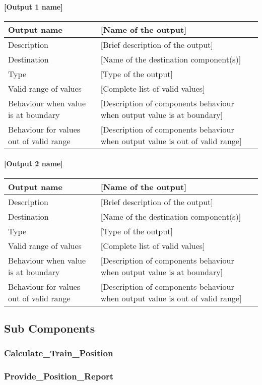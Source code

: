\paragraph{[Output 1 name]}

\begin{longtable}{p{}p{}}
\toprule
Output name				& [Name of the output] \\
\midrule
Description				& [Brief description of the output] \\
\midrule
Destination				& [Name of the destination component(s)] \\ 
\midrule
Type					& [Type of the output] \\
\midrule
Valid range of values	& [Complete list of valid values] \\
\midrule
Behaviour when value is at boundary	& [Description of components behaviour when output value is at boundary] \\
\midrule
Behaviour for values out of valid range	& [Description of components behaviour when output value is out of valid range] \\
\bottomrule
\end{longtable}


\paragraph{[Output 2 name]}

\begin{longtable}{p{}p{}}
\toprule
Output name				& [Name of the output] \\
\midrule
Description				& [Brief description of the output] \\
\midrule
Destination				& [Name of the destination component(s)] \\ 
\midrule
Type					& [Type of the output] \\
\midrule
Valid range of values	& [Complete list of valid values] \\
\midrule
Behaviour when value is at boundary	& [Description of components behaviour when output value is at boundary] \\
\midrule
Behaviour for values out of valid range	& [Description of components behaviour when output value is out of valid range] \\
\bottomrule
\end{longtable}


\subsection{Sub Components}\label{s:manage_track_data_subcomponents}

\subsubsection{Calculate\_Train\_Position}


\subsubsection{Provide\_Position\_Report}



